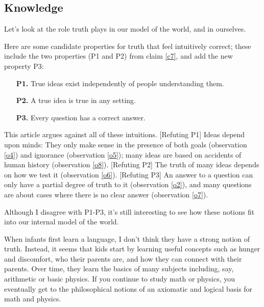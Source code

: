 \documentclass[11pt, oneside]{article}   	%
\begin{document}
\subsection{Knowledge}


Let's look at the role truth plays in our model of the world, and in
ourselves.

Here are some candidate properties for truth that feel intuitively correct;
these include the two properties (P1 and P2) from claim \ref{c7}, and
add the new property P3:
\begin{itemize}
    \item[{\bf P1.}] True ideas exist independently of people understanding
        them.
    \item[{\bf P2.}] A true idea is true in any setting.
    \item[{\bf P3.}] Every question has a correct answer.
\end{itemize}
This article argues against all of these intuitions.
[Refuting P1] Ideas depend upon minds: They only make sense in the presence of
both goals (observation \ref{o4}) and ignorance (observation \ref{o5}); many
ideas are based on accidents of human history (observation \ref{o8}).
[Refuting P2] The
truth of many ideas depends on how we test it (observation \ref{o6}).
[Refuting P3] An answer to a question can only have a partial degree of truth to
it
(observation \ref{o2}), and many questions are about cases where
there is no clear answer (observation \ref{o7}).

Although I disagree with P1-P3, it's still interesting to see how these notions
fit into our internal model of the world.

When infants first learn a language,
I don't think they have a strong
notion of truth.
Instead, it seems that kids start by learning
useful concepts such as
hunger and discomfort, who their parents are, and how they can connect with
their parents.
Over time, they learn the basics of many subjects including, say,
arithmetic or basic physics.
If you continue to study math or physics, you eventually get to the
philosophical notions of an axiomatic and logical basis for math and physics.
\end{document}
